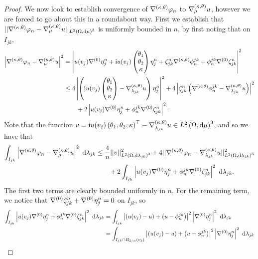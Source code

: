 \begin{proof}
	We now look to establish convergence of $\nabla^{\left( \kappa, \theta \right)}\varphi_n$ to $\nabla^{\left( \kappa, \theta \right)}_{\mu}u$, however we are forced to go about this in a roundabout way.
	First we establish that $\lvert\lvert \nabla^{\left( \kappa, \theta \right)}\varphi_n-\nabla^{\left( \kappa, \theta \right)}_{\mu}u \rvert\rvert_{L^{2}\left( \Omega,\mathrm{d} \mu \right)^3}$ is uniformly bounded in $n$, by first noting that on $I_{jk}$,
	\begin{align*}
		\left\lvert \nabla^{\left( \kappa, \theta \right)}\varphi_n - \nabla^{\left( \kappa, \theta \right)}_{\mu}u \right\rvert^2
		&= \left\lvert u(v_j)\nabla^{(0)}\eta_j^n + \mathrm{i} u(v_j)\begin{pmatrix} \theta_1 \\ \theta_2 \\ \kappa \end{pmatrix} \eta_j^n + \zeta_{jk}^n\nabla^{\left( \kappa, \theta \right)}\phi_n^{jk} + \phi_n^{jk}\nabla^{(0)}\zeta_{jk}^n \right\rvert^2 \\
		&\leq 4\left\lvert \left( \mathrm{i} u(v_j)\begin{pmatrix} \theta_1 \\ \theta_2 \\ \kappa \end{pmatrix}-\nabla^{\left( \kappa, \theta \right)}_{\lambda_{jk}}u \right)\eta_j^n \right\rvert^2 + 4\left\lvert \zeta_{jk}^n\left( \nabla^{\left( \kappa, \theta \right)}\phi_n^{jk}-\nabla^{\left( \kappa, \theta \right)}_{\lambda_{jk}}u \right) \right\rvert^2 \\
		&\qquad + 2\left\lvert u(v_j)\nabla^{(0)}\eta_j^n + \phi_n^{jk}\nabla^{(0)}\zeta_{jk}^n \right\rvert^2.
	\end{align*}
	Note that the function $v = \mathrm{i} u(v_j)\left( \theta_1,\theta_2,\kappa \right)^\top - \nabla^{\left( \kappa, \theta \right)}_{\lambda_{jk}}u\in L^{2}\left( \Omega,\mathrm{d} \mu \right)^3$, and so we have that
	\begin{align*}
		\int_{I_{jk}} \left\lvert \nabla^{\left( \kappa, \theta \right)}\varphi_n - \nabla^{\left( \kappa, \theta \right)}_{\mu}u \right\rvert^2  \ \mathrm{d}\lambda_{jk}
		&\leq \frac{4}{n}\lvert\lvert v \rvert\rvert_{L^{2}\left( \Omega,\mathrm{d} \lambda_{jk} \right)^3}^2 + 4\lvert\lvert \nabla^{\left( \kappa, \theta \right)}\varphi_n 
		- \nabla^{\left( \kappa, \theta \right)}_{\lambda_{jk}}u \rvert\rvert_{L^{2}\left( \Omega,\mathrm{d} \lambda_{jk} \right)^3}^2 \\
		&\qquad + 2\int_{I_{jk}} \left\lvert u(v_j)\nabla^{(0)}\eta_j^n + \phi_n^{jk}\nabla^{(0)}\zeta_{jk}^n \right\rvert^2  \ \mathrm{d}\lambda_{jk}.
	\end{align*}
	The first two terms are clearly bounded uniformly in $n$.
	For the remaining term, we notice that $\nabla^{(0)}\zeta_{jk}^n+\nabla^{(0)}\eta_j^n=0$ on $I_{jk}$, so 
	\begin{align*}
		\integral{I_{jk}}{ \abs{u(v_j)\ograd\eta_j^n + \phi_n^{jk}\ograd\zeta_{jk}^n}^2 }{\lambda_{jk}}
		&= \integral{I_{jk}}{ \abs{ \bracs{u(v_j)-u} + \bracs{u - \phi_n^{jk}} }^2\abs{ \ograd\eta_j^n }^2 }{\lambda_{jk}} \\
		&= \integral{I_{jk}\cap B_{2/n}(v_j)}{ \abs{ \bracs{u(v_j)-u} + \bracs{u - \phi_n^{jk}} }^2\abs{ \ograd\eta_j^n }^2 }{\lambda_{jk}} \\

\end{align*}
\end{proof}
